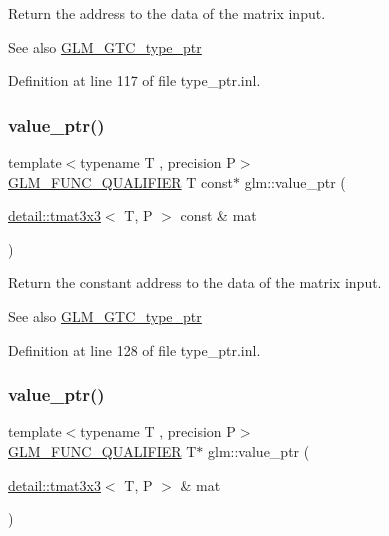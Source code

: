 Return the address to the data of the matrix input. \begin{DoxySeeAlso}{See also}
\hyperlink{group__gtc__type__ptr}{G\+L\+M\+\_\+\+G\+T\+C\+\_\+type\+\_\+ptr} 
\end{DoxySeeAlso}


Definition at line 117 of file type\+\_\+ptr.\+inl.

\mbox{\label{group__gtc__type__ptr_ga78acb1fd15ce7d1d2861493fac9693ec}} 
\subsubsection{\texorpdfstring{value\+\_\+ptr()}{value\_ptr()}\hspace{0.1cm}{\footnotesize\ttfamily [10/27]}}
{\footnotesize\ttfamily template$<$typename T , precision P$>$ \\
\hyperlink{setup_8hpp_a33fdea6f91c5f834105f7415e2a64407}{G\+L\+M\+\_\+\+F\+U\+N\+C\+\_\+\+Q\+U\+A\+L\+I\+F\+I\+ER} T const$\ast$ glm\+::value\+\_\+ptr (\begin{DoxyParamCaption}\item[{\hyperlink{structglm_1_1detail_1_1tmat3x3}{detail\+::tmat3x3}$<$ T, P $>$ const \&}]{mat }\end{DoxyParamCaption})}

Return the constant address to the data of the matrix input. \begin{DoxySeeAlso}{See also}
\hyperlink{group__gtc__type__ptr}{G\+L\+M\+\_\+\+G\+T\+C\+\_\+type\+\_\+ptr} 
\end{DoxySeeAlso}


Definition at line 128 of file type\+\_\+ptr.\+inl.

\mbox{\label{group__gtc__type__ptr_gaad64150511d5c6a2d2c7afec724e4064}} 
\subsubsection{\texorpdfstring{value\+\_\+ptr()}{value\_ptr()}\hspace{0.1cm}{\footnotesize\ttfamily [11/27]}}
{\footnotesize\ttfamily template$<$typename T , precision P$>$ \\
\hyperlink{setup_8hpp_a33fdea6f91c5f834105f7415e2a64407}{G\+L\+M\+\_\+\+F\+U\+N\+C\+\_\+\+Q\+U\+A\+L\+I\+F\+I\+ER} T$\ast$ glm\+::value\+\_\+ptr (\begin{DoxyParamCaption}\item[{\hyperlink{structglm_1_1detail_1_1tmat3x3}{detail\+::tmat3x3}$<$ T, P $>$ \&}]{mat }\end{DoxyParamCaption})}

